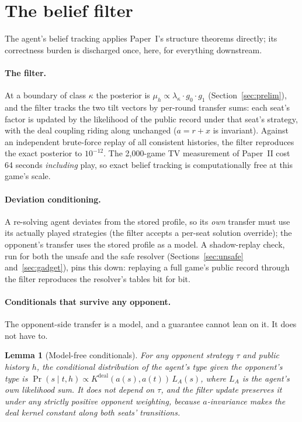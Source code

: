 \documentclass[11pt]{article}
\theoremstyle{plain}
\newtheorem{lemma}[theorem]{Lemma}
\theoremstyle{definition}
\theoremstyle{remark}
\begin{document}
\section{The belief filter}\label{sec:filter}

The agent's belief tracking applies Paper~I's structure theorems
directly; its correctness burden is discharged once, here, for
everything downstream.

\paragraph{The filter.} At a boundary of class $\kappa$ the posterior
is $\mu_h \propto \lambda_\kappa\cdot g_0\cdot g_1$
(Section~\ref{sec:prelim}), and the filter tracks the two tilt vectors
by per-round transfer sums: each seat's factor is updated by the
likelihood of the public record under that seat's strategy, with the
deal coupling riding along unchanged ($a=r+x$ is invariant). Against
an independent brute-force replay of all consistent histories, the
filter reproduces the exact posterior to $10^{-12}$. The 2{,}000-game
TV measurement of Paper~II cost 64 seconds \emph{including} play, so
exact belief tracking is computationally free at this game's scale.

\paragraph{Deviation conditioning.} A re-solving agent deviates from
the stored profile, so its \emph{own} transfer must use its actually
played strategies (the filter accepts a per-seat solution override);
the opponent's transfer uses the stored profile as a model. A
shadow-replay check, run for both the unsafe and the safe resolver
(Sections~\ref{sec:unsafe} and~\ref{sec:gadget}), pins this down:
replaying a full game's public record through the filter reproduces
the resolver's tables bit for bit.

\paragraph{Conditionals that survive any opponent.} The opponent-side
transfer is a model, and a guarantee cannot lean on it. It does not
have to.

\begin{lemma}[Model-free conditionals]\label{lem:cond}
For any opponent strategy $\tau$ and public history $h$, the
conditional distribution of the agent's type given the opponent's type
is $\Pr(s\mid t,h) \propto K^{\mathrm{deal}}(a(s),a(t))\,L_A(s)$,
where $L_A$ is the agent's own likelihood sum. It does not depend on
$\tau$, and the filter update preserves it under \emph{any} strictly
positive opponent weighting, because $a$-invariance makes the deal
kernel constant along both seats' transitions.
\end{lemma}
\end{document}

